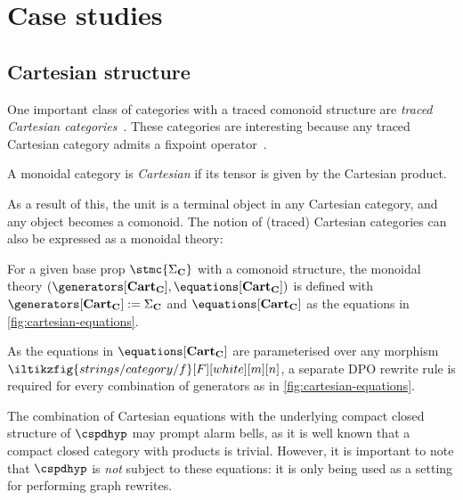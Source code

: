 \section{Case studies}

\subsection{Cartesian structure}

One important class of categories with a traced comonoid structure are
\emph{traced Cartesian categories}~\cite{cazanescu1990new,hasegawa1997recursion}.
These categories are interesting because any traced Cartesian
category admits a fixpoint operator~\cite[Thm. 3.1]{hasegawa1997recursion}.

\begin{definition}
    A monoidal category is \emph{Cartesian} if its tensor is given by the
    Cartesian product.
\end{definition}

As a result of this, the unit is a terminal object in any Cartesian category,
and any object becomes a comonoid.
The notion of (traced) Cartesian categories can also be expressed as a monoidal
theory:

\begin{definition}
    For a given base prop \(\stmc{\Sigma_\mathbf{C}}\) with a comonoid
    structure, the monoidal theory \((
        \generators[\mathbf{Cart}_\mathbf{C}],
        \equations[\mathbf{Cart}_\mathbf{C}]
    )\) is defined with \(
        \generators[\mathbf{Cart}_\mathbf{C}] := \Sigma_\mathbf{C}
    \) and \(
        \equations[\mathbf{Cart}_\mathbf{C}]
    \) as the equations in \cref{fig:cartesian-equations}.
\end{definition}

As the equations in \(\equations[\mathbf{Cart}_\mathbf{C}]\) are parameterised
over any morphism \(\iltikzfig{strings/category/f}[F][white][m][n]\), a separate
DPO rewrite rule is required for every combination of generators as in
\cref{fig:cartesian-equations}.

\begin{remark}
    The combination of Cartesian equations with the underlying compact closed
    structure of \(\cspdhyp\) may prompt alarm bells, as it is well known that
    a compact closed category with products is trivial.
    However, it is important to note that \(\cspdhyp\) is \emph{not} subject to
    these equations: it is only being used as a setting for performing graph
    rewrites.
\end{remark}

